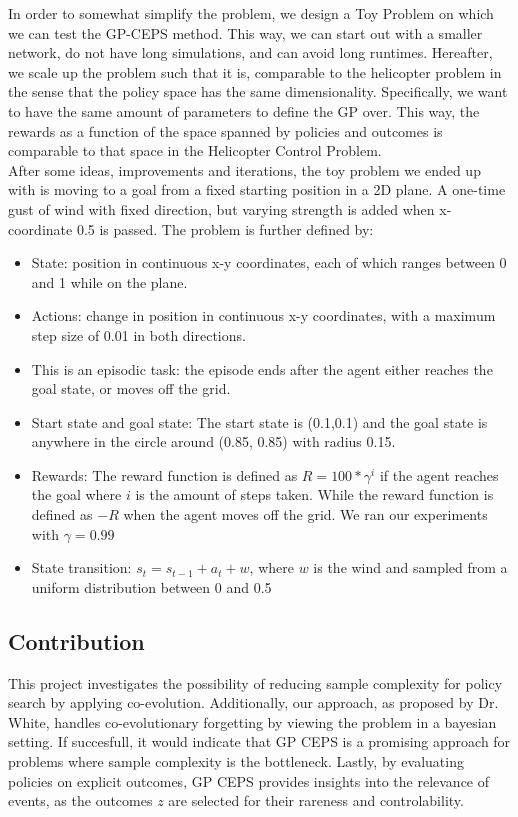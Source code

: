 In order to somewhat simplify the problem, we design a Toy Problem on which we can test the GP-CEPS method. This way, we can start out with a smaller network, do not have long simulations, and can avoid long runtimes. Hereafter, we scale up the problem such that it is, comparable to the helicopter problem in the sense that the policy space has the same dimensionality. Specifically, we want to have the same amount of parameters to define the GP over. This way, the rewards as a function of the space spanned by policies and outcomes is comparable to that space in the Helicopter Control Problem.\\
After some ideas, improvements and iterations, the toy problem we ended up with is moving to a goal from a fixed starting position in a 2D plane. A one-time gust of wind with fixed direction, but varying strength is added when x-coordinate 0.5 is passed. The problem is further defined by:

\begin{itemize}
\item State: position in continuous x-y coordinates, each of which ranges between 0 and 1 while on the plane.
\item Actions: change in position in continuous x-y coordinates, with a maximum step size of 0.01 in both directions. 
\item This is an episodic task: the episode ends after the agent either reaches the goal state, or moves off the grid.
\item Start state and goal state: The start state is (0.1,0.1) and the goal state is anywhere in the circle around (0.85, 0.85) with radius 0.15.
\item Rewards: The reward function is defined as $R = 100 * \gamma^{i}$ if the agent reaches the goal where $i$ is the amount of steps taken. While the reward function is defined as $-R$ when the agent moves off the grid. We ran our experiments with $\gamma = 0.99$
\item State transition: $s_t = s_{t-1} + a_t + w$, where $w$ is the wind and sampled from a uniform distribution between 0 and 0.5
\end{itemize} 

\subsection{Contribution}
This project investigates the possibility of reducing sample complexity for policy search by applying co-evolution. Additionally, our approach, as proposed by Dr. White, handles co-evolutionary forgetting by viewing the problem in a bayesian setting. If succesfull, it would indicate that GP CEPS is a promising approach for problems where sample complexity is the bottleneck. Lastly, by evaluating policies on explicit outcomes, GP CEPS provides insights into the relevance of events, as the outcomes $z$ are selected for their rareness and controlability.

